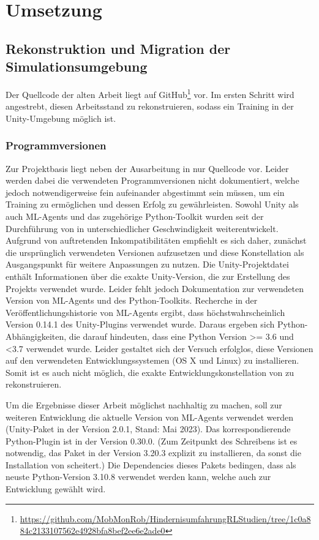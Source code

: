 \chapter{Umsetzung}
\section{Rekonstruktion und Migration der Simulationsumgebung}
Der Quellcode der alten Arbeit liegt auf GitHub\footnote{\url{https://github.com/MobMonRob/HindernisumfahrungRLStudien/tree/1c0a884c2133107562e4928bfa8bef2ee6e2ade0}} vor.
Im ersten Schritt wird angestrebt, diesen Arbeitsstand zu rekonstruieren, sodass ein Training in der Unity-Umgebung möglich ist.

\subsection{Programmversionen}
Zur Projektbasis liegt neben der Ausarbeitung in \cite{waidner.2020} nur Quellcode vor.
Leider werden dabei die verwendeten Programmversionen nicht dokumentiert, welche jedoch notwendigerweise fein aufeinander abgestimmt sein müssen, um ein Training zu ermöglichen und dessen Erfolg zu gewährleisten.
Sowohl Unity als auch ML-Agents und das zugehörige Python-Toolkit wurden seit der Durchführung von \cite{waidner.2020} in unterschiedlicher Geschwindigkeit weiterentwickelt.
Aufgrund von auftretenden Inkompatibilitäten empfiehlt es sich daher, zunächst die ursprünglich verwendeten Versionen aufzusetzen und diese Konstellation als Ausgangspunkt für weitere Anpassungen zu nutzen.
Die Unity-Projektdatei enthält Informationen über die exakte Unity-Version, die zur Erstellung des Projekts verwendet wurde.
Leider fehlt jedoch Dokumentation zur verwendeten Version von ML-Agents und des Python-Toolkits.
Recherche in der Veröffentlichungshistorie von ML-Agents ergibt, dass höchstwahrscheinlich Version 0.14.1 des Unity-Plugins verwendet wurde.
Daraus ergeben sich Python-Abhängigkeiten, die darauf hindeuten, dass eine Python Version \textgreater= 3.6 und \textless 3.7 verwendet wurde.
Leider gestaltet sich der Versuch erfolglos, diese Versionen auf den verwendeten Entwicklungssystemen (OS X und Linux) zu installieren.
Somit ist es auch nicht möglich, die exakte Entwicklungskonstellation von \cite{waidner.2020} zu rekonstruieren.

Um die Ergebnisse dieser Arbeit möglichst nachhaltig zu machen, soll zur weiteren Entwicklung die aktuelle Version von ML-Agents verwendet werden (Unity-Paket in der Version 2.0.1, Stand: Mai 2023).
Das korrespondierende Python-Plugin ist  in der Version 0.30.0.
(Zum Zeitpunkt des Schreibens ist es notwendig, das Paket  in der Version 3.20.3 explizit zu installieren, da sonst die Installation von  scheitert.)
Die Dependencies dieses Pakets bedingen, dass als neuste Python-Version 3.10.8 verwendet werden kann, welche auch zur Entwicklung gewählt wird.

